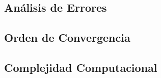 \documentclass[a4paper,10pt,twocolumn]{article}
\begin{document}


\subsection{Análisis de Errores}\label{subsec:errores}



\subsection{Orden de Convergencia}\label{subsec:convergencia}



\subsection{Complejidad Computacional}\label{subsec:complejidad}

\end{document}
